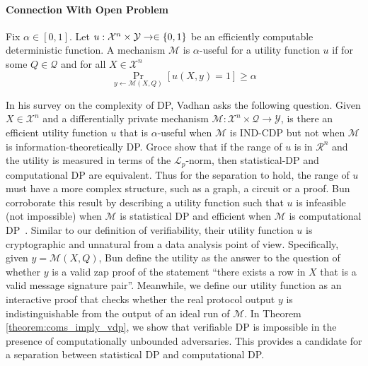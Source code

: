 \paragraph{Connection With Open Problem}
%
\begin{definition}
  \label{defn:utility} Fix $\alpha \in [0,1]$. Let $u : \mathcal{X}^n \times \mathcal{Y} \rightarrow \in \{ 0, 1\}$  be an efficiently computable deterministic function. A mechanism $\mathcal{M}$ is $\alpha$-useful for a utility function $u$ if for some $Q \in \mathcal{Q}$ and for all $X \in \mathcal{X}^n$
  \begin{equation}
  \Pr_{y \leftarrow \mathcal{M}(X, Q)}[u(X, y) = 1] \geq \alpha  
  \end{equation}
  \end{definition}

In his survey on the complexity of DP, Vadhan \cite{vadhan2017complexity} asks the following question. Given $X \in \mathcal{X}^n$ and a differentially private mechanism $\mathcal{M}: \mathcal{X}^n \times \mathcal{Q} \rightarrow \mathcal{Y}$, is there an efficient utility function $u$ that is $\alpha$-useful when $\mathcal{M}$ is IND-CDP but not when $\mathcal{M}$ is information-theoretically DP. 
Groce \etal \cite{groce2011limits} show that if the range of $u$ is in $\mathcal{R}^n$ and the utility is measured in terms of the $\mathcal{L}_p$-norm, then statistical-DP and computational DP are equivalent. Thus for the separation to hold, the range of $u$ must have a more complex structure, such as a graph, a circuit or a proof. 
Bun \etal corroborate this result by describing a utility function such that $u$ is infeasible (not impossible) when $\mathcal{M}$ is statistical DP and efficient when $\mathcal{M}$ is computational DP~\cite{bun2016separating}. 
Similar to our definition of verifiability, their utility function $u$ is cryptographic and unnatural from a data analysis point of view. Specifically, given $y = \mathcal{M}(X, Q)$, Bun \etal define the utility as the answer to the question of whether $y$ is a valid zap proof \cite{dwork2000zaps} of the statement ``there exists a row in $X$ that is a valid message signature pair''. 
 Meanwhile, we define our utility function as an interactive proof that checks whether the real protocol output $y$ is indistinguishable from the output of an ideal run of $\mathcal{M}$. 
 In Theorem \ref{theorem:coms_imply_vdp}, we show that verifiable DP is impossible in the presence of computationally unbounded adversaries. 
This provides a candidate for a separation between statistical DP and computational DP.
 
